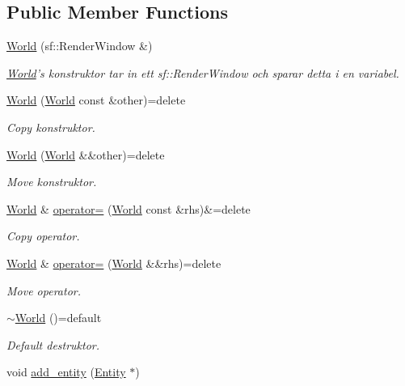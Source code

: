 \subsection*{Public Member Functions}
\begin{DoxyCompactItemize}
\item 
\hyperlink{classWorld_a64c31c6063dddddaa69ff078fcfaac3f}{World} (sf\+::\+Render\+Window \&)
\begin{DoxyCompactList}\small\item\em \hyperlink{classWorld}{World}'s konstruktor tar in ett sf\+::\+Render\+Window och sparar detta i en variabel. \end{DoxyCompactList}\item 
\hyperlink{classWorld_a69eeaec5442964e520c638fbbba5ad29}{World} (\hyperlink{classWorld}{World} const \&other)=delete
\begin{DoxyCompactList}\small\item\em Copy konstruktor. \end{DoxyCompactList}\item 
\hyperlink{classWorld_a9319f9fe52db6162be2269479d76100d}{World} (\hyperlink{classWorld}{World} \&\&other)=delete
\begin{DoxyCompactList}\small\item\em Move konstruktor. \end{DoxyCompactList}\item 
\hyperlink{classWorld}{World} \& \hyperlink{classWorld_a93bf098ff19ca834e40b011a03a25ed8}{operator=} (\hyperlink{classWorld}{World} const \&rhs)\&=delete
\begin{DoxyCompactList}\small\item\em Copy operator. \end{DoxyCompactList}\item 
\hyperlink{classWorld}{World} \& \hyperlink{classWorld_a81066ed30db54ae9060f9394d6f2c01e}{operator=} (\hyperlink{classWorld}{World} \&\&rhs)=delete
\begin{DoxyCompactList}\small\item\em Move operator. \end{DoxyCompactList}\item 
\hyperlink{classWorld_a3d07ed2f713c3946fbbaa3a1b7b7f8c0}{$\sim$\+World} ()=default
\begin{DoxyCompactList}\small\item\em Default destruktor. \end{DoxyCompactList}\item 
void \hyperlink{classWorld_ae6af4b63e388f6dde1ccaa5afe2592be}{add\+\_\+entity} (\hyperlink{classEntity}{Entity} $\ast$)

\end{DoxyCompactItemize}
